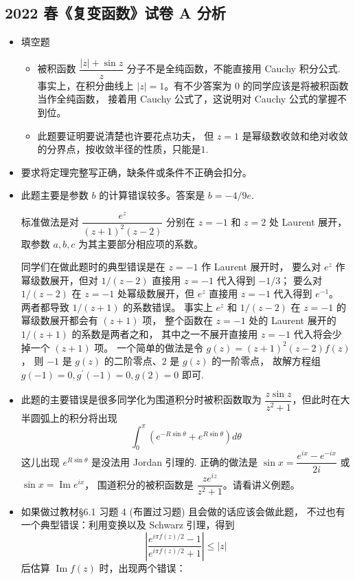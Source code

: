 \subsection*{2022 春《复变函数》试卷 A 分析}
\begin{itemize}
\item[一、]填空题
\begin{itemize}
\item[(2)] 被积函数 $\dfrac{|z|+\sin z}{z}$ 分子不是全纯函数，不能直接用 Cauchy 积分公式. 
事实上，在积分曲线上 $|z|=1$。有不少答案为 $0$ 的同学应该是将被积函数当作全纯函数，
接着用 Cauchy 公式了，这说明对 Cauchy 公式的掌握不到位。
\item[(6)] 此题要证明要说清楚也许要花点功夫，
但 $z=1$ 是幂级数收敛和绝对收敛的分界点，按收敛半径的性质，只能是$1$.
\end{itemize}

\item[二、]要求将定理完整写正确，缺条件或条件不正确会扣分。

\item[三、]此题主要是参数 $b$ 的计算错误较多。答案是 $b=-4 / 9 e$.

标准做法是对 $\dfrac{e^{z}}{(z+1)^{2}(z-2)}$ 分别在 $z=-1$ 和 $z=2$ 处 Laurent 展开，
取参数 $a, b, c$ 为其主要部分相应项的系数。

同学们在做此题时的典型错误是在 $z=-1$ 作 Laurent 展开时，
要么对 $e^{z}$ 作幂级数展开，但对 $1 /(z-2)$ 直接用 $z=-1$ 代入得到 $-1 / 3$；
要么对 $1 /(z-2)$ 在 $z=-1$ 处幂级数展开，但 $e^{z}$ 直接用 $z=-1$ 代入得到 $e^{-1}$。
两者都导致 $1 /(z+1)$ 的系数错误。
事实上 $e^{z}$ 和 $1 /(z-2)$ 在 $z=-1$ 的幂级数展开都会有 $(z+1)$ 项，
整个函数在 $z=-1$ 处的 Laurent 展开的 $1 /(z+1)$ 的系数是两者之和，
其中之一不展开直接用 $z=-1$ 代入将会少掉一个 $(z+1)$ 项。
一个简单的做法是令 $g(z)=(z+1)^{2}(z-2)f(z)$，
则 $-1$ 是 $g(z)$ 的二阶零点、$2$ 是 $g(z)$ 的一阶零点，
故解方程组 $g(-1)=0, g^{\prime}(-1)=0, g(2)=0$ 即可.

\item[四、]此题的主要错误是很多同学化为围道积分时被积函数取为 $\dfrac{z \sin z}{z^{2}+1}$，但此时在大半圆弧上的积分将出现
$$\int_{0}^{\pi}\left(e^{-R \sin \theta}+e^{R \sin \theta}\right) d \theta$$
这儿出现 $e^{R \sin \theta}$ 是没法用 Jordan 引理的.
正确的做法是 $\sin x=\dfrac{e^{i x}-e^{-i x}}{2i}$ 或 $\sin x=\operatorname{Im} e^{i x}$，
围道积分的被积函数是 $\dfrac{z e^{i z}}{z^{2}+1}$。请看讲义例题。

\item[五、]如果做过教材§6.1 习题 4 (布置过习题) 且会做的话应该会做此题，
不过也有一个典型错误：利用变换以及 Schwarz 引理，得到
$$\left|\frac{e^{i \pi f(z) / 2}-1}{e^{i \pi f(z) / 2}+1}\right| \leq|z|$$
后估算 $\operatorname{Im} f(z)$ 时，出现两个错误：


\end{itemize}
